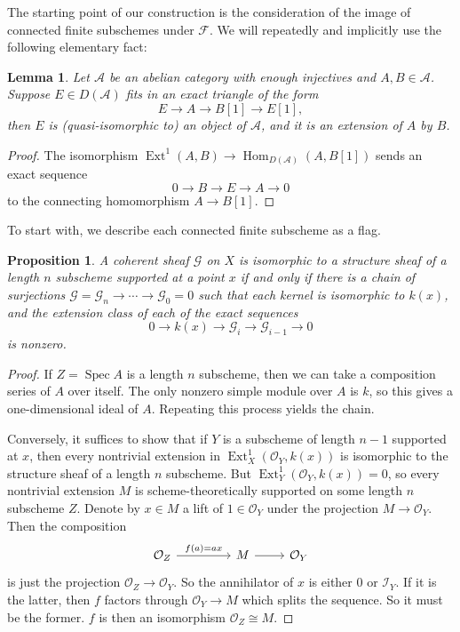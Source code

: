 \documentclass{amsart}
\theoremstyle{plain}
\newtheorem{lemma}[theorem]{Lemma}
\newtheorem{proposition}[theorem]{Proposition}
\theoremstyle{definition}
\theoremstyle{remark}
\begin{document}
    The starting point of our construction is the consideration of the image of connected finite subschemes under $\mathcal F$.
    We will repeatedly and implicitly use the following elementary fact:
    \begin{lemma}
        Let $\mathcal A$ be an abelian category with enough injectives and $A,B\in\mathcal A$.
        Suppose $E\in D(\mathcal A)$ fits in an exact triangle of the form
        \[E\to A\to B[1]\to E[1],\]
        then $E$ is (quasi-isomorphic to) an object of $\mathcal A$, and it is an extension of $A$ by $B$.
    \end{lemma}
    \begin{proof}
        The isomorphism $\operatorname{Ext}^1(A,B)\to\operatorname{Hom}_{D(\mathcal A)}(A,B[1])$ sends an exact sequence
        \[0\to B\to E\to A\to 0\]
        to the connecting homomorphism $A\to B[1]$.
    \end{proof}
    To start with, we describe each connected finite subscheme as a flag.
    \begin{proposition}
        A coherent sheaf $\mathcal G$ on $X$ is isomorphic to a structure sheaf of a length $n$ subscheme supported at a point $x$ if and only if there is a chain of surjections $\mathcal G=\mathcal G_n\to\cdots\to\mathcal G_0=0$ such that each kernel is isomorphic to $k(x)$, and the extension class of each of the exact sequences
        \[0\to k(x)\to \mathcal G_i\to\mathcal G_{i-1}\to 0\]
        is nonzero.
    \end{proposition}
    \begin{proof}
        If $Z=\operatorname{Spec}A$ is a length $n$ subscheme, then we can take a composition series of $A$ over itself.
        The only nonzero simple module over $A$ is $k$, so this gives a one-dimensional ideal of $A$.
        Repeating this process yields the chain.

        Conversely, it suffices to show that if $Y$ is a subscheme of length $n-1$ supported at $x$, then every nontrivial extension in $\operatorname{Ext}_X^1(\mathcal O_Y,k(x))$ is isomorphic to the structure sheaf of a length $n$ subscheme.
        But $\operatorname{Ext}_Y^1(\mathcal O_Y,k(x))=0$, so every nontrivial extension $M$ is scheme-theoretically supported on some length $n$ subscheme $Z$.
        Denote by $x\in M$ a lift of $1\in \mathcal O_Y$ under the projection $M\to\mathcal O_Y$.
        Then the composition
        \[\begin{tikzcd}
            \mathcal O_Z\arrow{r}{f(a)=ax} &[2em] M\rar & \mathcal O_Y
        \end{tikzcd}\]
        is just the projection $\mathcal O_Z\to\mathcal O_Y$.
        So the annihilator of $x$ is either $0$ or $\mathcal I_Y$.
        If it is the latter, then $f$ factors through $\mathcal O_Y\to M$ which splits the sequence.
        So it must be the former.
        $f$ is then an isomorphism $\mathcal O_Z\cong M$.
    \end{proof}
\end{document}
